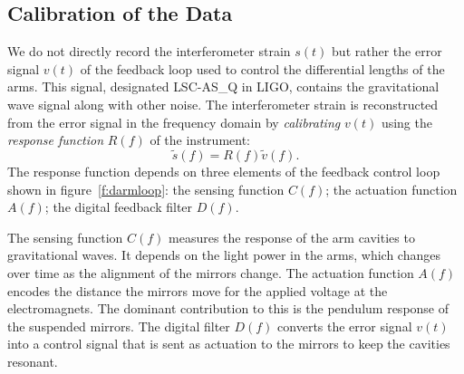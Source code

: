 \subsection{Calibration of the Data}
\label{ss:calibration}

We do not directly record the interferometer strain $s(t)$ but rather the
error signal $v(t)$ of the feedback loop used to control the differential
lengths of the arms. This signal, designated {LSC-AS\_Q} in LIGO,
contains the gravitational wave signal along with other noise. The
interferometer strain is reconstructed from the error signal in the
frequency domain by \emph{calibrating} $v(t)$ using the \emph{response
function} $R(f)$ of the instrument:
\begin{equation}
\tilde{s}(f) = R(f) \tilde{v}(f).
\end{equation}
The response function depends on three elements of the feedback control loop
shown in figure~\ref{f:darmloop}: the sensing function $C(f)$; the actuation
function $A(f)$; the digital feedback filter $D(f)$\cite{Gonzalez:2002}. 

The sensing function $C(f)$ measures the response of the arm cavities to
gravitational waves. It depends on the light power in the arms, which changes
over time as the alignment of the mirrors change.  The actuation function
$A(f)$ encodes the distance the mirrors move for the applied voltage at the
electromagnets. The dominant contribution to this is the pendulum response of
the suspended mirrors.  The digital filter $D(f)$ converts the error signal
$v(t)$ into a control signal that is sent as actuation to the mirrors to keep
the cavities resonant.

